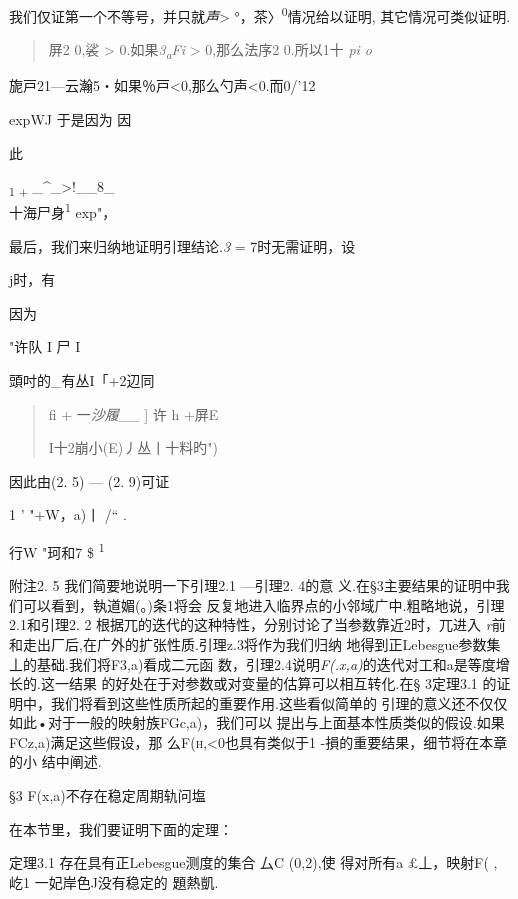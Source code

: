 \documentclass{article}
\begin{document}
我们仅证第一个不等号，并只就\emph{声}\textgreater{}
°，茶〉\textsuperscript{0}情况给以证明, 其它情况可类似证明.

\begin{quote}
屏2 0,裟 \textgreater{} 0.如果\emph{3\textsubscript{a}Fi} \textgreater{}
0,那么法序2 0.所以1十 \emph{pi o}
\end{quote}

旎戸21---云瀚5・如果％戸\textless{}0,那么勺声\textless{}0.而0/'12

expWJ 于是因为 因

此

\textsubscript{1 +} \_\^{}\_\textgreater{}!\_\_8\_\\
十海尸身\textsuperscript{1} exp"，

最后，我们来归纳地证明引理结论.\emph{3} = 7时无需证明，设

j时，有

因为

"许队 I 尸 I

頭吋的\_有丛I「+2辺同

\begin{quote}
fi + 一\emph{沙履\_\_} {]} \textbar{}许\textbar{} h +{屏E}

I十2崩小(E)丿\textbar{}丛\textbar{}丨十料旳")
\end{quote}

因此由(2. 5) --- (2. 9)可证

1 ' {"+W，a)丨} /`` .

行W "珂和7 \$ \textsuperscript{1}

附注2. 5 我们简要地说明一下引理2.1 ---引理2. 4的意
义.在§3主要结果的证明中我们可以看到，執道媚(。)条1将会
反复地进入临界点的小邻域广中.粗略地说，引理2.1和引理2. 2
根据兀的迭代的这种特性，分别讨论了当参数靠近2时，兀进入
\emph{r}前和走出厂后,在广外的扩张性质.引理z.3将作为我们归纳
地得到正Lebesgue参数集丄的基础.我们将F3,a)看成二元函
数，引理2.4说明\emph{F(.x,a)}的迭代对工和a是等度增长的.这一结果
的好处在于对参数或对变量的估算可以相互转化.在§ 3定理3.1
的证明中，我们将看到这些性质所起的重要作用.这些看似简单的
引理的意义还不仅仅如此•对于一般的映射族FGc,a)，我们可以
提出与上面基本性质类似的假设.如果FCz,a)满足这些假设，那
么\textsc{F(h,\textless{}0}也具有类似于1 -損的重要结果，细节将在本章的小
结中阐述.

§3 F(x,a)不存在稳定周期轨问塩

在本节里，我们要证明下面的定理：

定理3.1 存在具有正Lebesgue测度的集合 厶C (0,2),使 得对所有a £丄，映射F(
, 屹1 一妃岸色J没有稳定的 題熱凱.
\end{document}
